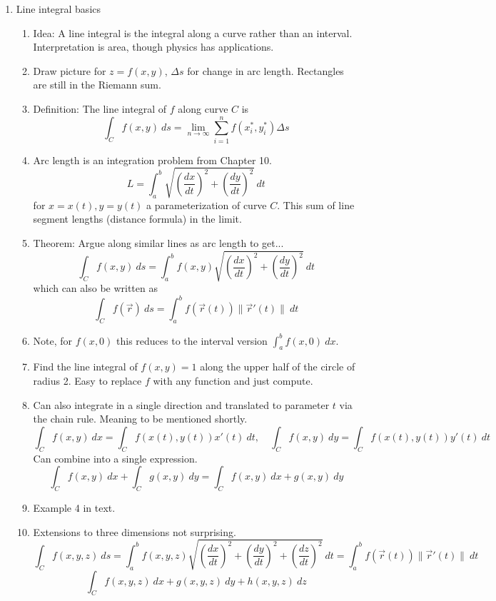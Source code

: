 \documentclass{article}
\begin{document}
\begin{enumerate}

\item Line integral basics
\begin{enumerate}
\item Idea: A line integral is the integral along a curve rather than an interval. Interpretation is area, though physics has applications.
\item Draw picture for $z=f(x,y)$, $\Delta s$ for change in arc length. Rectangles are still in the Riemann sum.
\item Definition: The line integral of $f$ along curve $C$ is
\[
\int_C f(x,y) ~ds = \lim_{n \rightarrow \infty} \sum_{i = 1}^n f(x_i^*, y_i^*) \Delta s
\]
\item Arc length is an integration problem from Chapter 10.
\[
L = \int_a^b \sqrt{\left(\frac{dx}{dt}\right)^2 + \left(\frac{dy}{dt}\right)^2} ~dt
\]
for $x=x(t), y=y(t)$ a parameterization of curve $C$. This sum of line segment lengths (distance formula) in the limit.
\item Theorem: Argue along similar lines as arc length to get...
\[
\int_C f(x,y) ~ds =\int_a^b f(x,y) \sqrt{\left(\frac{dx}{dt}\right)^2 + \left(\frac{dy}{dt}\right)^2} ~dt
\]
which can also be written as
\[
\int_C f(\vec{r}) ~ds =\int_a^b f(\vec{r}(t)) \| \vec{r}'(t) \| ~dt
\]
\item Note, for $f(x,0)$ this reduces to the interval version $\int_a^b f(x,0) ~dx$.
\item Find the line integral of $f(x,y)=1$ along the upper half of the circle of radius 2. Easy to replace $f$ with any function and just compute.
\item Can also integrate in a single direction and translated to parameter $t$ via the chain rule. Meaning to be mentioned shortly.
\[
\int_C f(x,y) ~dx = \int_C f(x(t),y(t)) x'(t)~dt, \quad \int_C f(x,y) ~dy = \int_C f(x(t),y(t)) y'(t)~dt
\]
Can combine into a single expression.
\[
\int_C f(x,y) ~dx + \int_C g(x,y) ~dy  = \int_C f(x,y) ~dx  + g(x,y) ~dy
\]
\item Example 4 in text.
\item Extensions to three dimensions not surprising.
\[
\int_C f(x,y,z) ~ds =\int_a^b f(x,y,z) \sqrt{\left(\frac{dx}{dt}\right)^2 + \left(\frac{dy}{dt}\right)^2+ \left(\frac{dz}{dt}\right)^2} ~dt = \int_a^b f(\vec{r}(t)) \| \vec{r}'(t) \| ~dt
\]
\[
\int_C f(x,y,z) ~dx  + g(x,y,z) ~dy + h(x,y,z) ~dz
\]

\end{enumerate}


\end{enumerate}
\end{document}
